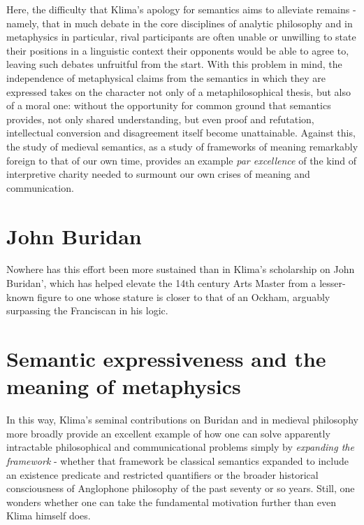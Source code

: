 \documentclass[]{article}
\begin{document}
Here, the difficulty that Klima's apology for semantics aims to alleviate remains - 
namely, that in much debate in the core disciplines of analytic philosophy  
and in metaphysics in particular, 
rival participants are often unable or unwilling to state their positions in a linguistic context their opponents would be able to agree to, 
leaving such debates unfruitful from the start. 
With this problem in mind, 
the independence of metaphysical claims from the semantics in which they are expressed takes on the character not only of a metaphilosophical thesis, 
but also of a moral one: 
without the opportunity for common ground that semantics provides, 
not only shared understanding, 
but even proof and refutation, 
intellectual conversion and disagreement itself become unattainable.
Against this, 
the study of medieval semantics, 
as a study of frameworks of meaning remarkably foreign to that of our own time, 
provides an example \emph{par excellence} of the kind of interpretive charity needed to surmount our own crises of meaning and communication. 

\section{John Buridan}
Nowhere has this effort been more sustained than in Klima's scholarship on John Buridan', 
which has helped elevate the 14th century Arts Master from a lesser-known figure to one whose stature is closer to that of an Ockham, 
arguably surpassing the Franciscan in his logic.

\section{Semantic expressiveness and the meaning of metaphysics}
In this way, 
Klima's seminal contributions on Buridan and in medieval philosophy more broadly provide an excellent example of how one can solve apparently intractable philosophical and communicational problems 
simply by \emph{expanding the framework}
 - whether that framework be classical semantics expanded to include an existence predicate and restricted quantifiers
 or the broader historical consciousness of Anglophone philosophy of the past seventy or so years. 
Still, one wonders whether one can take the fundamental motivation further than even Klima himself does. 
\end{document}
